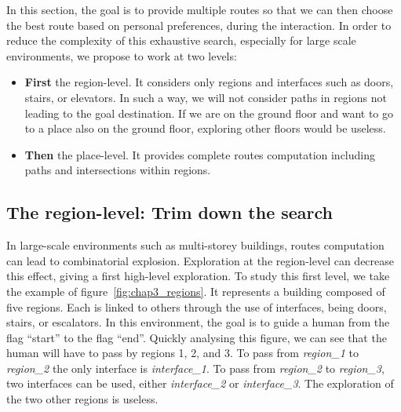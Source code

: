 In this section, the goal is to provide multiple routes so that we can then choose the best route based on personal preferences, during the interaction. In order to reduce the complexity of this exhaustive search, especially for large scale environments, we propose to work at two levels:
\begin{itemize}
\item \textbf{First} the region-level. It considers only regions and interfaces such as doors, stairs, or elevators. In such a way, we will not consider paths in regions not leading to the goal destination. If we are on the ground floor and want to go to a place also on the ground floor, exploring other floors would be useless.
\item \textbf{Then} the place-level. It provides complete routes computation including paths and intersections within regions.
\end{itemize}

\subsection{The region-level: Trim down the search}

In large-scale environments such as multi-storey buildings, routes computation can lead to combinatorial explosion. Exploration at the region-level can decrease this effect, giving a first high-level exploration. To study this first level, we take the example of figure~\ref{fig:chap3_regions}. It represents a building composed of five regions. Each is linked to others through the use of interfaces, being doors, stairs, or escalators. In this environment, the goal is to guide a human from the flag ``start'' to the flag ``end''. Quickly analysing this figure, we can see that the human will have to pass by regions 1, 2, and 3. To pass from \textit{region\_1} to \textit{region\_2} the only interface is \textit{interface\_1}. To pass from \textit{region\_2} to \textit{region\_3}, two interfaces can be used, either \textit{interface\_2} or \textit{interface\_3}. The exploration of the two other regions is useless.

